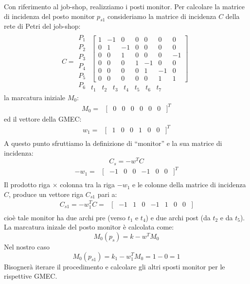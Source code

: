 \documentclass[a4paper]{report}
\begin{document}
Con riferimento al job-shop, realizziamo i posti monitor. Per
calcolare la matrice di incidenza del posto monitor $p_{s1}$
consideriamo la matrice di incidenza $C$ della rete di Petri del
job-shop:
\[
C =
\begin{array}{c}
  P_1\\
  P_2\\
  P_3\\
  P_4\\
  P_5\\
  P_6
\end{array}
\begin{array}{cc}
  \\
 \begin{bmatrix}
   1 & -1 & 0 & 0 & 0 & 0 & 0\\
   0 & 1 & -1 & 0 & 0 & 0 & 0\\
   0 & 0 & 1 & 0 & 0 & 0 & -1\\
   0 & 0 & 0 & 1 & -1 & 0 & 0\\
   0 & 0 & 0 & 0 & 1 & -1 & 0\\
   0 & 0 & 0 & 0 & 0 & 1 & 1
 \end{bmatrix}\\
  t_1\;\;\;t_2\;\;\;t_3\;\;\;t_4\;\;\;t_5\;\;\;t_6\;\;\;t_7
\end{array}
\]
la marcatura iniziale $M_0$:
\[
\begin{array}{ccccccccc}
  M_0 = & [ & 0 & 0 & 0 & 0 & 0 & 0 &]^T
\end{array}
\]
ed il vettore della GMEC:
\[
\begin{array}{ccccccccc}
  w_1 = & [ & 1 & 0 & 0 & 1 & 0 & 0 & ]^T\\
\end{array}
\]
A questo punto sfruttiamo la definizione di ``monitor'' e la sua
matrice di incidenza:
\begin{equation}\label{eq:matriceIncidenzaMonitor}
C_s = -w^T C
\end{equation}
\[
\begin{array}{ccccccccc}
  -w_1 = & [ & -1 & 0 & 0 & -1 & 0 & 0 & ]^T\\
\end{array}
\]
Il prodotto riga $\times$ colonna tra la riga $-w_1$ e le colonne
della matrice di incidenza $C$, produce un vettore riga $C_{s1}$ pari
a:
\[
\begin{array}{cccccccccc}
  C_{s1} = -w_1^T C= & [ & -1 & 1 & 0 & -1 & 1 & 0 & 0 &]\\
\end{array}
\]
cio\`e tale monitor ha due archi pre (verso $t_1$ e $t_4$) e due archi
post (da $t_2$ e da $t_5$). La marcatura inizale del posto monitor
\`e calcolata come:
\begin{equation}\label{eq:marcaturaInizialeMonitor}
M_0(p_s) = k - w^TM_0
\end{equation}
Nel nostro caso
\[
M_0(p_{s1}) = k_1 - w_1^T M_0 = 1 - 0 = 1
\]
Bisogner\`a iterare il procedimento e calcolare gli altri sposti
monitor per le rispettive GMEC.
\end{document}
